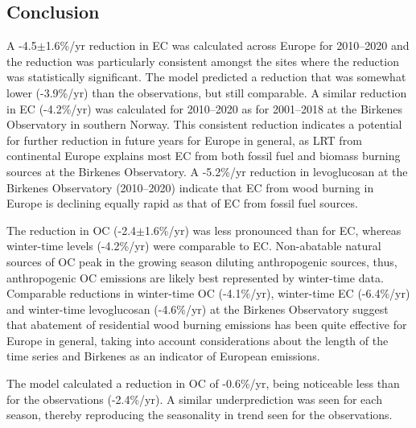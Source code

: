 




\subsection{Conclusion}
\label{ss:trendsECOCconc}

A -4.5$\pm$1.6\%/yr reduction in EC was calculated across Europe for
2010--2020 and the reduction was particularly consistent amongst the
sites where the reduction was statistically significant. The model
predicted a reduction that was somewhat lower (-3.9\%/yr) than the
observations, but still comparable. A similar reduction in EC (-4.2\%/yr)
was calculated for 2010--2020 as for 2001--2018 at the Birkenes
Observatory in southern Norway. This consistent reduction indicates a
potential for further reduction in future years for Europe in general,
as LRT from continental Europe explains most EC from both fossil fuel
and biomass burning sources at the Birkenes Observatory. A  -5.2\%/yr
reduction in levoglucosan at the Birkenes Observatory (2010--2020)
 indicate that EC from wood burning in Europe is declining equally
rapid as that of EC from fossil fuel sources.

The reduction in OC (-2.4$\pm$1.6\%/yr) was less pronounced than for EC,
whereas winter-time levels (-4.2\%/yr) were comparable to EC. Non-abatable
natural sources of OC peak in the growing season diluting anthropogenic
sources, thus, anthropogenic OC emissions are likely best represented by
winter-time data. Comparable reductions in winter-time OC (-4.1\%/yr),
winter-time EC (-6.4\%/yr) and winter-time levoglucosan (-4.6\%/yr)
at the Birkenes Observatory suggest that abatement of residential
wood burning emissions has been quite effective for Europe in general,
taking into account considerations about the length of the time series
and Birkenes as an indicator of European emissions.

The model calculated a reduction in OC of -0.6\%/yr, being noticeable
less than for the observations (-2.4\%/yr). A similar underprediction
was seen for each season, thereby reproducing the seasonality in trend
seen for the observations.


